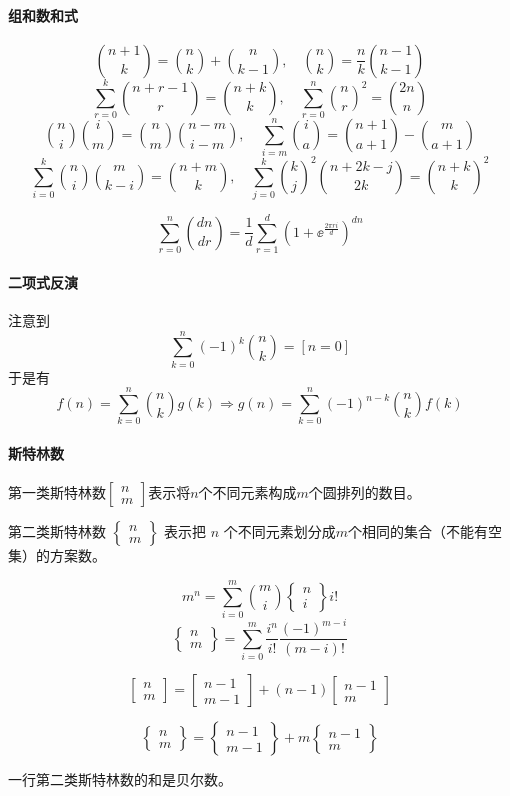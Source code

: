 \documentclass{proart}
\begin{document}
\paragraph{组和数和式}
\[ \binom{n+1}{k} = \binom{n}{k} + \binom{n}{k-1}, \quad \binom{n}{k} = \frac{n}{k} \binom{n-1}{k-1} \]
\[ \sum\limits_{r=0}^k \binom{n+r-1}{r} = \binom{n+k}{k}, \quad \sum\limits_{r=0}^n \binom{n}{r}^2 = \binom{2n}{n} \]
\[ \binom{n}{i}\binom{i}{m} = \binom{n}{m}\binom{n-m}{i-m}, \quad \sum\limits_{i=m}^n \binom{i}{a} = \binom{n+1}{a+1} - \binom{m}{a+1} \]
\[ \sum\limits_{i=0}^k \binom{n}{i}\binom{m}{k-i} = \binom{n+m}{k}, \quad \sum\limits_{j=0}^k \binom{k}{j}^2 \binom{n+2k-j}{2k} = \binom{n+k}{k}^2 \]

\[ \sum\limits_{r=0}^n \binom{dn}{dr} = \frac{1}{d} \sum_{r=1}^d  \left( 1+\ee^{\tfrac{2\pi r i}{d}} \right)^{dn} \]

\paragraph{二项式反演}

注意到
\[ \sum_{k=0}^n (-1)^k \binom{n}{k} = [n=0] \]
于是有
\[ f(n) = \sum_{k=0}^n \binom{n}{k} g(k) \Rightarrow g(n) = \sum_{k=0}^n (-1)^{n-k}\binom{n}{k} f(k) \]

\paragraph{斯特林数}

第一类斯特林数$\begin{bmatrix}n\\ m\end{bmatrix}$表示将$n$个不同元素构成$m$个圆排列的数目。

第二类斯特林数 $\begin{Bmatrix} n \\m \end{Bmatrix}$ 表示把 $n$ 个不同元素划分成$m$个相同的集合（不能有空集）的方案数。

\[
m^n=\sum_{i=0}^m \binom m i  \left\{ \begin{matrix} n \\ i \end{matrix} \right\} i!
\]
\[\left\{ \begin{matrix} n\\m \end{matrix} \right\}=\sum_{i=0}^m \frac{i^n}{i!} \frac{(-1)^{m-i}}{(m-i)!}\]

\[\begin{bmatrix}n \\ m\end{bmatrix}=\begin{bmatrix}n-1 \\ m-1\end{bmatrix}+(n-1) \begin{bmatrix}n-1 \\ m\end{bmatrix}\]

\[\begin{Bmatrix}n \\ m\end{Bmatrix}=\begin{Bmatrix}n-1 \\ m-1\end{Bmatrix}+m \begin{Bmatrix}n-1 \\ m\end{Bmatrix}\]

一行第二类斯特林数的和是贝尔数。
\end{document}
